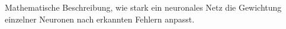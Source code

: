 \documentclass[preview]{standalone}
\begin{document}
\begin{center}
Mathematische Beschreibung, wie stark ein neuronales Netz die Gewichtung einzelner Neuronen nach erkannten Fehlern anpasst.
\end{center}
\end{document}
